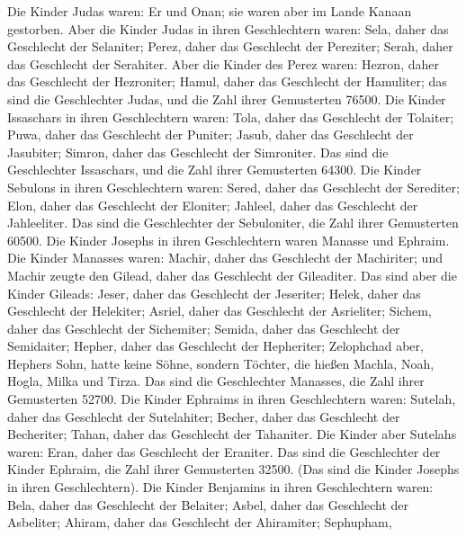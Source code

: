 Die Kinder Judas waren: Er und Onan; sie waren aber im
Lande Kanaan gestorben.  Aber die Kinder Judas in ihren
Geschlechtern waren: Sela, daher das Geschlecht der Selaniter; Perez,
daher das Geschlecht der Pereziter; Serah, daher das Geschlecht der
Serahiter.  Aber die Kinder des Perez waren: Hezron,
daher das Geschlecht der Hezroniter; Hamul, daher das Geschlecht der
Hamuliter;  das sind die Geschlechter Judas, und die Zahl
ihrer Gemusterten 76500.  Die Kinder Issaschars in ihren
Geschlechtern waren: Tola, daher das Geschlecht der Tolaiter; Puwa,
daher das Geschlecht der Puniter;  Jasub, daher das
Geschlecht der Jasubiter; Simron, daher das Geschlecht der Simroniter.
 Das sind die Geschlechter Issaschars, und die Zahl ihrer
Gemusterten 64300.  Die Kinder Sebulons in ihren
Geschlechtern waren: Sered, daher das Geschlecht der Serediter; Elon,
daher das Geschlecht der Eloniter; Jahleel, daher das Geschlecht der
Jahleeliter.  Das sind die Geschlechter der Sebuloniter,
die Zahl ihrer Gemusterten 60500.  Die Kinder Josephs in
ihren Geschlechtern waren Manasse und Ephraim.  Die
Kinder Manasses waren: Machir, daher das Geschlecht der Machiriter; und
Machir zeugte den Gilead, daher das Geschlecht der Gileaditer.
 Das sind aber die Kinder Gileads: Jeser, daher das
Geschlecht der Jeseriter; Helek, daher das Geschlecht der Helekiter;
 Asriel, daher das Geschlecht der Asrieliter; Sichem,
daher das Geschlecht der Sichemiter;  Semida, daher das
Geschlecht der Semidaiter; Hepher, daher das Geschlecht der Hepheriter;
 Zelophchad aber, Hephers Sohn, hatte keine Söhne,
sondern Töchter, die hießen Machla, Noah, Hogla, Milka und Tirza.
 Das sind die Geschlechter Manasses, die Zahl ihrer
Gemusterten 52700.  Die Kinder Ephraims in ihren
Geschlechtern waren: Sutelah, daher das Geschlecht der Sutelahiter;
Becher, daher das Geschlecht der Becheriter; Tahan, daher das Geschlecht
der Tahaniter.  Die Kinder aber Sutelahs waren: Eran,
daher das Geschlecht der Eraniter.  Das sind die
Geschlechter der Kinder Ephraim, die Zahl ihrer Gemusterten 32500. (Das
sind die Kinder Josephs in ihren Geschlechtern).  Die
Kinder Benjamins in ihren Geschlechtern waren: Bela, daher das
Geschlecht der Belaiter; Asbel, daher das Geschlecht der Asbeliter;
Ahiram, daher das Geschlecht der Ahiramiter;  Sephupham,
